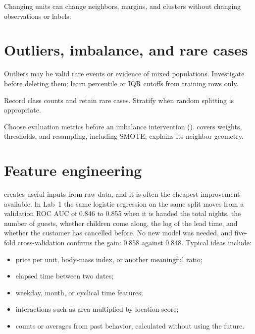 \begin{keyidea}
Changing units can change neighbors, margins, and clusters without changing observations or labels.
\end{keyidea}

\section{Outliers, imbalance, and rare cases}

Outliers may be valid rare events or evidence of mixed populations. Investigate before deleting them; learn percentile or IQR cutoffs from training rows only.

Record class counts and retain rare cases. Stratify when random splitting is appropriate.

\begin{keyidea}
Choose evaluation metrics before an imbalance intervention ().  covers weights, thresholds, and resampling, including SMOTE;  explains its neighbor geometry.
\end{keyidea}

\section{Feature engineering}

 creates useful inputs from raw data, and it is often the cheapest improvement available. In Lab~1 the same logistic regression on the same split moves from a validation ROC AUC of 0.846 to 0.855 when it is handed the total nights, the number of guests, whether children come along, the log of the lead time, and whether the customer has cancelled before. No new model was needed, and five-fold cross-validation confirms the gain: 0.858 against 0.848. Typical ideas include:

\begin{itemize}
  \item price per unit, body-mass index, or another meaningful ratio;
  \item elapsed time between two dates;
  \item weekday, month, or cyclical time features;
  \item interactions such as area multiplied by location score;
  \item counts or averages from past behavior, calculated without using the future.
\end{itemize}

